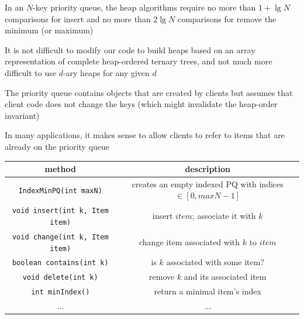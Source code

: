 \documentclass[8pt,a4paper,compress]{beamer}
\begin{document}
\begin{frame}[fragile]
\pause

In an $N$-key priority queue, the heap algorithms require no more than $1 + \lg N$ comparisons for insert and no more than $2 \lg N$ comparisons for remove the minimum (or maximum)

\pause
\bigskip

It is not difficult to modify our code to build heaps based on an array representation of complete heap-ordered ternary trees, and not much more difficult to use $d$-ary heaps for any given $d$

\pause
\bigskip

The priority queue contains objects that are created by clients but assumes that client code does not change the keys (which might invalidate the heap-order invariant)

\pause
\bigskip

In many applications, it makes sense to allow clients to refer to items that are already on the priority queue 

\pause

\begin{center}
\begin{tabular}{cc}
method & description \\ \hline
\lstinline$IndexMinPQ(int maxN)$ & \makecell{creates an empty indexed PQ with \\ indices $\in [0, maxN - 1]$} \\
\lstinline$void insert(int k, Item item)$ & insert $item$; associate it with $k$ \\
\lstinline$void change(int k, Item item)$ & change item associated with $k$ to $item$ \\
\lstinline$boolean contains(int k)$ & is $k$ associated with some item? \\
\lstinline$void delete(int k)$ & remove $k$ and its associated item \\
\lstinline$int minIndex()$ & return a minimal item's index \\
$\dots$ & $\dots$
\end{tabular} 
\end{center}
\end{frame}
\end{document}
